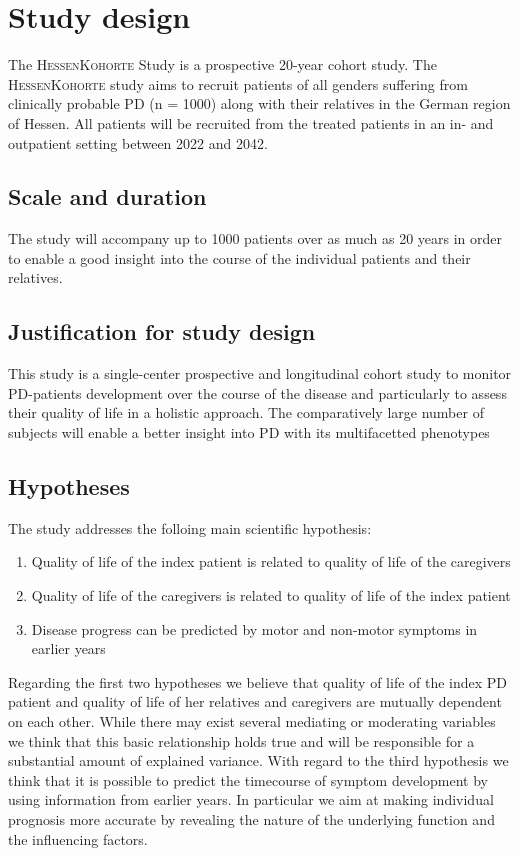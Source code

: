 \section{Study design}
The \textsc{HessenKohorte} Study is a prospective 20-year cohort study. The \textsc{HessenKohorte} study aims to recruit patients of all genders suffering from clinically probable \ac{PD} (n = 1000) along with their relatives in the German region of Hessen. All patients will be recruited from the treated patients in an in- and outpatient setting between 2022 and 2042. 

\subsection{Scale and duration}
The study will accompany up to 1000 patients over as much as 20 years in order to enable a good insight into the course of the individual patients and their relatives.
\subsection{Justification for study design}
This study is a single-center prospective and longitudinal cohort study to monitor \ac{PD}-patients development over the course of the disease and particularly to assess their quality of life in a holistic approach. The comparatively large number of subjects will enable a better insight into \ac{PD} with its multifacetted phenotypes

\subsection{Hypotheses}
\label{sec:hypotheses}
The study addresses the folloing main scientific hypothesis:
\begin{enumerate}
  \item Quality of life of the index patient is related to quality of life of the caregivers
  \item Quality of life of the caregivers is related to quality of life of the index patient
  \item Disease progress can be predicted by motor and non-motor symptoms in earlier years
\end{enumerate}
Regarding the first two hypotheses we believe that quality of life of the index \ac{PD} patient and quality of life of her relatives and caregivers are mutually dependent on each other. While there may exist several mediating or moderating variables we think that this basic relationship holds true and will be responsible for a substantial amount of explained variance. With regard to the third hypothesis we think that it is possible to predict the timecourse of symptom development by using information from earlier years. In particular we aim at making individual prognosis more accurate by revealing the nature of the underlying function and the influencing factors.


